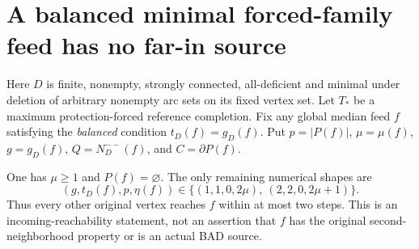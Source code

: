 \section{A balanced minimal forced-family feed has no far-in source}
\label{sec:balanced-forced-feed-minimal-refinement}

Here $D$ is finite, nonempty, strongly connected, all-deficient and
minimal under deletion of arbitrary nonempty arc sets on its fixed
vertex set. Let $T_*$ be a maximum protection-forced reference completion.
Fix any global median feed $f$ satisfying the \emph{balanced} condition
$t_D(f)=g_D(f)$. Put $p=|P(f)|$, $\mu=\mu(f)$,
$g=g_D(f)$, $Q=N_D^{--}(f)$, and $C=\partial P(f)$.

\begin{proposition}
\label{prop:balanced-forced-feed-three-branches}
\label{prop:balanced-forced-feed-far-in-empty}
One has $\mu\ge1$ and $P(f)=\varnothing$. The only remaining
numerical shapes are
\[
 (g,t_D(f),p,\eta(f))\in
 \bigl\{(1,1,0,2\mu),\ (2,2,0,2\mu+1)\bigr\}.
\]
Thus every other original vertex reaches $f$ within at most two steps.
This is an incoming-reachability statement, not an assertion that $f$
has the original second-neighborhood property or is an actual BAD source.
\end{proposition}
